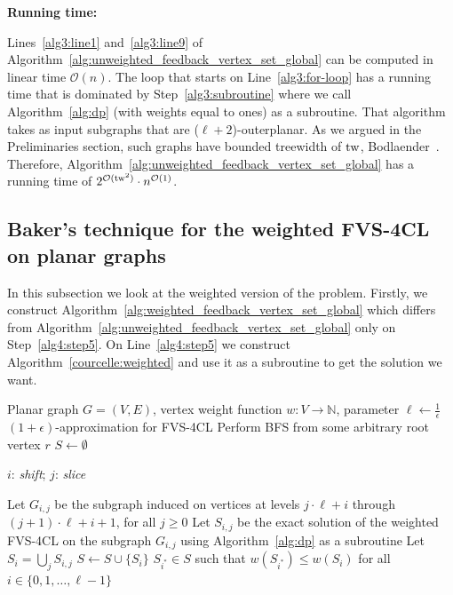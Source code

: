 \textbf{Running time:}

Lines~\ref{alg3:line1} and~\ref{alg3:line9} of Algorithm~\ref{alg:unweighted_feedback_vertex_set_global} 
can be computed in linear time $\mathcal{O}(n)$. The loop that starts on Line~\ref{alg3:for-loop} has a running time
that is dominated by Step~\ref{alg3:subroutine} where we call Algorithm~\ref{alg:dp} (with weights equal to ones) as a subroutine.
That algorithm takes as input subgraphs that are ($\ell + 2$)-outerplanar.
As we argued in the Preliminaries section, such graphs have bounded treewidth of $\operatorname{tw}$,
Bodlaender~\cite[Theorem 83]{bodlaender1998partial}.
Therefore, Algorithm~\ref{alg:unweighted_feedback_vertex_set_global} has a running time of 
$2^{\mathcal{O}(\operatorname{tw}^2)} \cdot n^{\mathcal{O}(1)}$.

\subsection{Baker's technique for the weighted FVS-4CL on planar graphs}
\label{subsec:baker_weighted_fvs}

In this subsection we look at the weighted version of the problem. 
Firstly, we construct Algorithm~\ref{alg:weighted_feedback_vertex_set_global} which differs from Algorithm~\ref{alg:unweighted_feedback_vertex_set_global} 
only on Step~\ref{alg4:step5}. On Line~\ref{alg4:step5}
we construct Algorithm~\ref{courcelle:weighted} and use it as a subroutine to get the solution we want.

\begin{algorithm}[H]
    \caption{Baker's technique for the weighted \textsc{FVS-4CL}}
    \label{alg:weighted_feedback_vertex_set_global}
    \begin{algorithmic}[1]
    \REQUIRE Planar graph $G = (V, E)$, vertex weight function $w : V \rightarrow \mathbb{N}$, parameter $\ell \leftarrow \frac{1}{\epsilon}$
    \ENSURE $(1 + \epsilon)$-approximation for \textsc{FVS-4CL}
    \STATE Perform \textsc{BFS} from some arbitrary root vertex $r$
    \STATE $S \leftarrow \emptyset$
    
    $i$: \textit{shift}; $j$: \textit{slice}
    
        \STATE Let $G_{i,j}$ be the subgraph induced on vertices at levels $j \cdot \ell + i$ through $(j+1) \cdot \ell + i + 1$, for all $j \geq 0$
        \STATE Let $S_{i, j}$ be the exact solution of the weighted FVS-4CL on the subgraph $G_{i, j}$ using Algorithm~\ref{alg:dp} as a subroutine \label{alg4:step5}
        \STATE Let $S_i = \bigcup_{j} S_{i,j}$
        \STATE $S \leftarrow S \cup \{S_i\}$
    \ENDFOR
    \RETURN $S_{i^*} \in S$ such that $w(S_{i^*}) \leq w(S_i)$ for all $i \in \{0, 1, \dots, \ell - 1\}$
    \end{algorithmic}
\end{algorithm}


